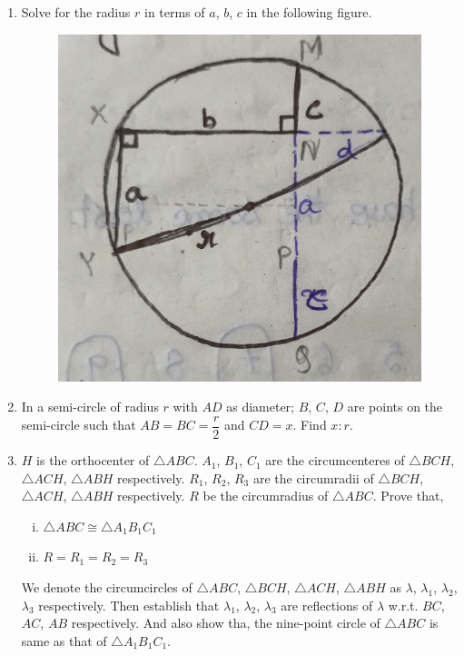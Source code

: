 \documentclass[11pt, a4paper]{article}
\begin{document}
\begin{enumerate}
	\item Solve for the radius $r$ in terms of $a$, $b$, $c$ in the following figure.
	\begin{figure}[H]
	\centering
	\includegraphics[scale=0.1]{IMG_20231026_015712_749}
	\end{figure}
	
	\item In a semi-circle of radius $r$ with $AD$ as diameter; $B$, $C$, $D$ are points on the semi-circle such that $AB = BC = \dfrac{r}{2}$ and $CD = x$. Find $x:r$.
	
	\item $H$ is the orthocenter of $\bigtriangleup ABC$. $A_1$, $B_1$, $C_1$ are the circumcenteres of $\bigtriangleup BCH$, $\bigtriangleup ACH$, $\bigtriangleup ABH$ respectively. $R_1$, $R_2$, $R_3$ are the circumradii of $\bigtriangleup BCH$, $\bigtriangleup ACH$, $\bigtriangleup ABH$ respectively. $R$ be the circumradius of $\bigtriangleup ABC$. Prove that, 
	\begin{enumerate}[(i)]
		\item $\bigtriangleup ABC \cong \bigtriangleup A_1B_1C_1$
		\item $R = R_1 = R_2 = R_3$
	
	\end{enumerate}
	We denote the circumcircles of $\bigtriangleup ABC$, $\bigtriangleup BCH$, $\bigtriangleup ACH$, $\bigtriangleup ABH$ as $\lambda$, $\lambda_1$, $\lambda_2$, $\lambda_3$ respectively. Then establish that $\lambda_1$, $\lambda_2$, $\lambda_3$ are reflections of $\lambda$ w.r.t. $BC$, $AC$, $AB$ respectively. And also show tha, the nine-point circle of $\bigtriangleup ABC$ is same as that of $\bigtriangleup A_1B_1C_1$.
	

\end{enumerate}
\end{document}
